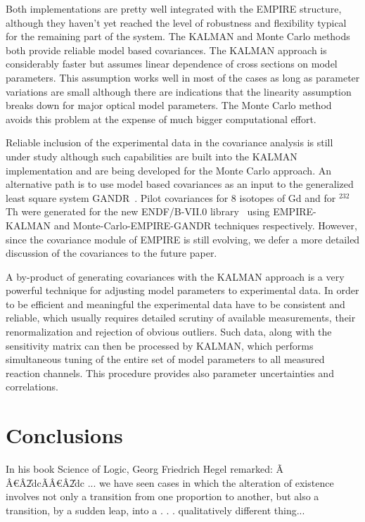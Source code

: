 Both implementations are pretty well integrated with the EMPIRE structure,
although they haven't yet reached the level of robustness and flexibility
typical for the remaining part of the system. The KALMAN and Monte Carlo
methods both provide reliable model based covariances. The KALMAN approach
is considerably faster but assumes linear dependence of cross sections on
model parameters. This assumption works well in most of the cases as long as
parameter variations are small although there are indications that the
linearity assumption breaks down for major optical model parameters. The
Monte Carlo method avoids this problem at the expense of much bigger
computational effort.

Reliable inclusion of the experimental data in the covariance analysis is
still under study although such capabilities are built into the KALMAN
implementation and are being developed for the Monte Carlo approach. An
alternative path is to use model based covariances as an input to the
generalized least square system GANDR~\cite{GANDR}. Pilot covariances for 8
isotopes of Gd and for $^{232}$Th were generated for the new ENDF/B-VII.0
library~\cite{ENDF-VII} using EMPIRE-KALMAN and Monte-Carlo-EMPIRE-GANDR
techniques respectively. However, since the covariance module of EMPIRE is
still evolving, we defer a more detailed discussion of the covariances to
the future paper.

A by-product of generating covariances with the KALMAN approach is a very
powerful technique for adjusting model parameters to experimental data. In
order to be efficient and meaningful the experimental data have to be
consistent and reliable, which usually requires detailed scrutiny of
available measurements, their renormalization and rejection of obvious
outliers. Such data, along with the sensitivity matrix can then be processed
by KALMAN, which performs simultaneous tuning of the entire set of model
parameters to all measured reaction channels. This procedure provides also
parameter uncertainties and correlations.

\section{Conclusions}

In his book Science of Logic, Georg Friedrich Hegel remarked: \~{A}\cents
\^{A}\euro \^{A}\U{2dc}\~{A}\cents \^{A}\euro \^{A}\U{2dc}
... we have seen cases in which the alteration of existence involves not
only a transition from one proportion to another, but also a transition, by
a sudden leap, into a . . . qualitatively different thing...

